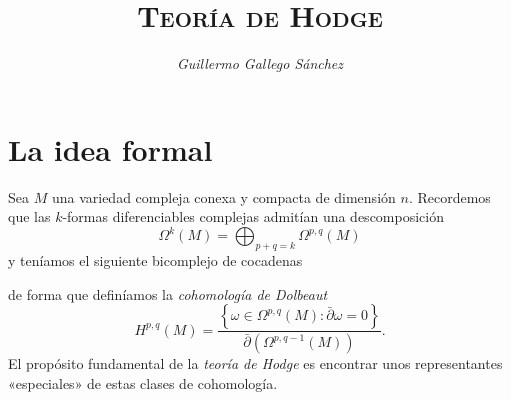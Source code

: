 \documentclass[12pt,a4paper]{article}
\author{\textit{Guillermo Gallego Sánchez}}
\title{\textsc{Teoría de Hodge}}
\date{}
\theoremstyle{definition} \newtheorem{defn}[thm]{Definición}
\theoremstyle{definition} \newtheorem{ejemplo}[thm]{Ejemplo}
\theoremstyle{definition} \newtheorem{ejercicio}[thm]{Ejercicio}
\theoremstyle{remark} \newtheorem*{obs}{Observación}
\begin{document}
\maketitle
\section{La idea formal}
Sea $M$ una variedad compleja conexa y compacta de dimensión $n$. Recordemos que las $k$-formas diferenciables complejas admitían una descomposición
\begin{equation*}
  \Omega^k(M)=\bigoplus_{p+q=k}\Omega^{p,q}(M)
\end{equation*}
y teníamos el siguiente bicomplejo de cocadenas
\begin{center}
\end{center}
de forma que definíamos la \emph{cohomología de Dolbeaut}
\begin{equation*}
  H^{p,q}(M)=\frac{\left\{  \omega \in \Omega^{p,q}(M) : \bar{\partial}\omega=0\right\}}{\bar{\partial}(\Omega^{p,q-1}(M))}.
\end{equation*}
El propósito fundamental de la \emph{teoría de Hodge} es encontrar unos representantes «especiales» de estas clases de cohomología.
  
\end{document}
